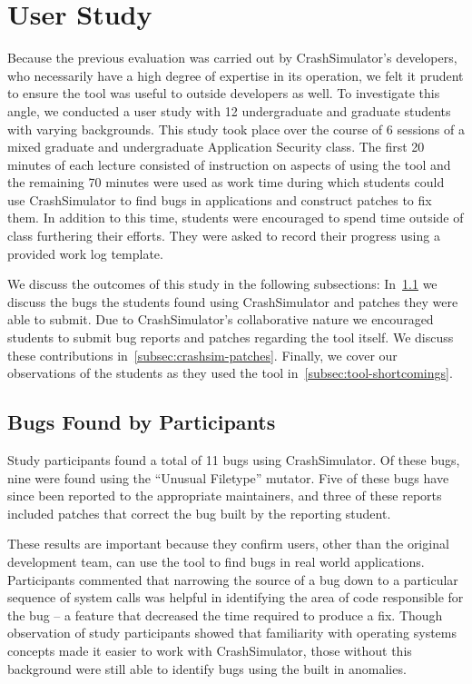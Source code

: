 \section{User Study}

Because the previous evaluation was carried out by CrashSimulator's developers,
who necessarily have a high degree of expertise in its operation,
we felt it prudent to ensure the tool was useful
to outside developers as well.
To investigate this angle,
we conducted a user study
with 12 undergraduate and graduate students with varying backgrounds.
This study took place over the course of 6  sessions
of a mixed graduate and undergraduate Application Security class.  The first 20
minutes of each lecture consisted of instruction on aspects of using the tool
and the remaining 70 minutes were used as work time during which students could
use CrashSimulator to find bugs in applications and construct patches to fix
them.  In addition to this time, students were encouraged to spend time outside
of class furthering their efforts.  They were asked to record their progress
using a provided work log template.

We discuss the outcomes of this study in the following subsections:
In~\ref{subsec:bugs-by-participants} we discuss
the bugs the students found using CrashSimulator
and patches they were able to submit.
Due to CrashSimulator's collaborative nature we encouraged students to submit
bug reports and patches regarding the tool itself.
We discuss these contributions in~\ref{subsec:crashsim-patches}.
Finally, we cover our observations of the students as they used the
tool in~\ref{subsec:tool-shortcomings}.

\subsection{Bugs Found by Participants}
\label{subsec:bugs-by-participants}
Study participants found a total of 11 bugs using CrashSimulator.
Of these bugs, nine were found using the ``Unusual Filetype'' mutator.
Five of these bugs have since been reported to the appropriate maintainers,
and three of these reports included patches
that correct the bug
built by the reporting student.

These results are important
because they confirm
users, other than the original development team,
can use the tool to find bugs in real world applications.
Participants commented that narrowing the source of a bug
down to a particular sequence of system calls
was helpful in identifying the area of
code responsible for the bug -- a feature
that decreased the time required to produce a fix.
Though observation of study participants
showed that familiarity with operating systems concepts
made it easier to work with CrashSimulator,
those without this background were still able to identify bugs using the
built in anomalies.

